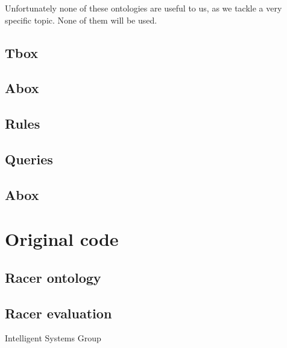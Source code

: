 \documentclass[a4paper,12pt]{report}
\begin{document}
Unfortunately none of these ontologies are useful to us, as we tackle a very specific topic. None of them will be used.


\clearpage
\section{Tbox}


\clearpage
\section{Abox}


\clearpage
\section{Rules}


\clearpage
\section{Queries}


\clearpage
\section{Abox}


\clearpage
\appendix

\chapter{Original code}
\section{Racer ontology}



\section{Racer evaluation}




\vspace{2cm}
\begin{center}
Intelligent Systems Group\\
\end{center}
\end{document}
